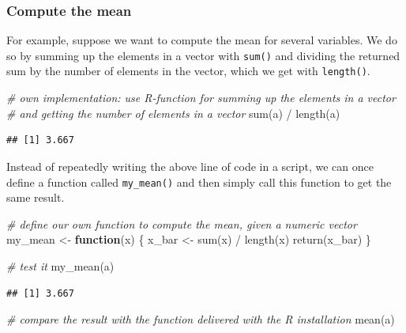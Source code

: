 \documentclass[
  12pt,
]{style/krantz}
\newenvironment{Shaded}{\begin{snugshade}}{\end{snugshade}}
\newcommand{\CommentTok}[1]{\textcolor[rgb]{0.56,0.35,0.01}{\textit{#1}}}
\newcommand{\ControlFlowTok}[1]{\textcolor[rgb]{0.13,0.29,0.53}{\textbf{#1}}}
\newcommand{\FunctionTok}[1]{\textcolor[rgb]{0.00,0.00,0.00}{#1}}
\newcommand{\NormalTok}[1]{#1}
\newcommand{\OtherTok}[1]{\textcolor[rgb]{0.56,0.35,0.01}{#1}}
\newcommand{\SpecialCharTok}[1]{\textcolor[rgb]{0.00,0.00,0.00}{#1}}
\begin{document}
\hypertarget{compute-the-mean}{%
\subsubsection{Compute the mean}\label{compute-the-mean}}

For example, suppose we want to compute the mean for several variables. We do so by summing up the elements in a vector with \texttt{sum()} and dividing the returned sum by the number of elements in the vector, which we get with \texttt{length()}.

\begin{Shaded}
\begin{Highlighting}[]
\CommentTok{\# own implementation: use R{-}function for summing up the elements in a vector}
\CommentTok{\# and getting the number of elements in a vector}
\FunctionTok{sum}\NormalTok{(a) }\SpecialCharTok{/} \FunctionTok{length}\NormalTok{(a)}
\end{Highlighting}
\end{Shaded}

\begin{verbatim}
## [1] 3.667
\end{verbatim}

Instead of repeatedly writing the above line of code in a script, we can once define a function called \texttt{my\_mean()} and then simply call this function to get the same result.

\begin{Shaded}
\begin{Highlighting}[]
\CommentTok{\# define our own function to compute the mean, given a numeric vector}
\NormalTok{my\_mean }\OtherTok{\textless{}{-}} \ControlFlowTok{function}\NormalTok{(x) \{}
\NormalTok{     x\_bar }\OtherTok{\textless{}{-}} \FunctionTok{sum}\NormalTok{(x) }\SpecialCharTok{/} \FunctionTok{length}\NormalTok{(x)}
     \FunctionTok{return}\NormalTok{(x\_bar)}
\NormalTok{\}}

\CommentTok{\# test it}
\FunctionTok{my\_mean}\NormalTok{(a)}
\end{Highlighting}
\end{Shaded}

\begin{verbatim}
## [1] 3.667
\end{verbatim}

\begin{Shaded}
\begin{Highlighting}[]
\CommentTok{\# compare the result with the function delivered with the R installation}
\FunctionTok{mean}\NormalTok{(a)}
\end{Highlighting}
\end{Shaded}
\end{document}

